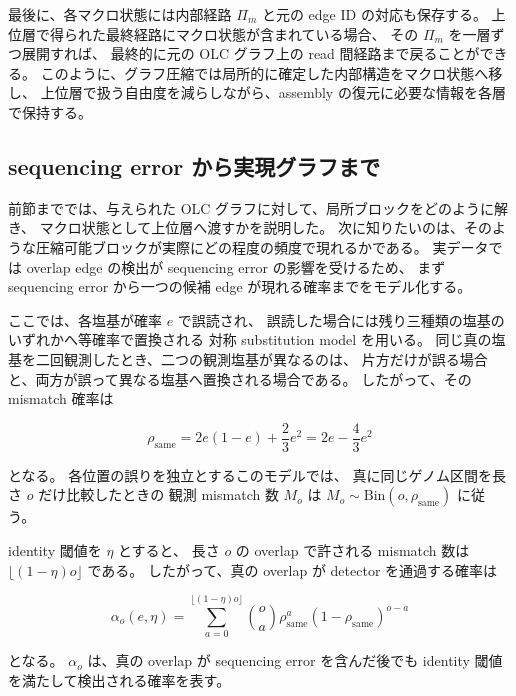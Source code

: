 \documentclass[a4j,10pt]{ujarticle}
\begin{document}
最後に、各マクロ状態には内部経路 $\Pi_m$ と元の edge ID の対応も保存する。
上位層で得られた最終経路にマクロ状態が含まれている場合、
その $\Pi_m$ を一層ずつ展開すれば、
最終的に元の OLC グラフ上の read 間経路まで戻ることができる。
このように、グラフ圧縮では局所的に確定した内部構造をマクロ状態へ移し、
上位層で扱う自由度を減らしながら、assembly の復元に必要な情報を各層で保持する。




\subsection{sequencing error から実現グラフまで}
\label{subsec:edge_probability}

前節まででは、与えられた OLC グラフに対して、局所ブロックをどのように解き、
マクロ状態として上位層へ渡すかを説明した。
次に知りたいのは、そのような圧縮可能ブロックが実際にどの程度の頻度で現れるかである。
実データでは overlap edge の検出が sequencing error の影響を受けるため、
まず sequencing error から一つの候補 edge が現れる確率までをモデル化する。

ここでは、各塩基が確率 $e$ で誤読され、
誤読した場合には残り三種類の塩基のいずれかへ等確率で置換される
対称 substitution model を用いる。
同じ真の塩基を二回観測したとき、二つの観測塩基が異なるのは、
片方だけが誤る場合と、両方が誤って異なる塩基へ置換される場合である。
したがって、その mismatch 確率は

\[
\rho_{\mathrm{same}}
=
2e(1-e)
+
\frac{2}{3}e^2
=
2e-\frac{4}{3}e^2
\]

となる。
各位置の誤りを独立とするこのモデルでは、
真に同じゲノム区間を長さ $o$ だけ比較したときの
観測 mismatch 数 $M_o$ は
$M_o\sim\mathrm{Bin}(o,\rho_{\mathrm{same}})$ に従う。

identity 閾値を $\eta$ とすると、
長さ $o$ の overlap で許される mismatch 数は
$\lfloor(1-\eta)o\rfloor$ である。
したがって、真の overlap が detector を通過する確率は

\begin{equation}
\alpha_o(e,\eta)
=
\sum_{a=0}^{\lfloor(1-\eta)o\rfloor}
\binom{o}{a}
\rho_{\mathrm{same}}^a
(1-\rho_{\mathrm{same}})^{o-a}
\label{eq:proper_overlap_acceptance_ch5}
\end{equation}

となる。
$\alpha_o$ は、真の overlap が sequencing error を含んだ後でも
identity 閾値を満たして検出される確率を表す。
\end{document}
